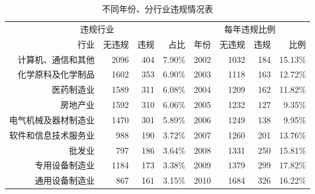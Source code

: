 \documentclass{article}
\begin{document}
\begin{table}[htbp]
  \centering\kaishu
  \caption{不同年份、分行业违规情况表}
    \begin{tabular}{rrrr|rrrr} \hline\hline
    \multicolumn{4}{c}{违规行业}      & \multicolumn{4}{c}{每年违规比例} \\
    行业    & 无违规   & 违规    & 占比 & 年份    & 无违规   & 违规    & 比例 \\ \hline
    计算机、通信和其他 & \multicolumn{1}{r}{2096} & \multicolumn{1}{r}{404} & \multicolumn{1}{r}{7.90\%} & \multicolumn{1}{r}{2002} & \multicolumn{1}{r}{1032} & \multicolumn{1}{r}{184} & \multicolumn{1}{r}{15.13\%} \\
    化学原料及化学制品 & \multicolumn{1}{r}{1602} & \multicolumn{1}{r}{353} & \multicolumn{1}{r}{6.90\%} & \multicolumn{1}{r}{2003} & \multicolumn{1}{r}{1118} & \multicolumn{1}{r}{163} & \multicolumn{1}{r}{12.72\%} \\
    医药制造业 & \multicolumn{1}{r}{1589} & \multicolumn{1}{r}{311} & \multicolumn{1}{r}{6.08\%} & \multicolumn{1}{r}{2004} & \multicolumn{1}{r}{1209} & \multicolumn{1}{r}{162} & \multicolumn{1}{r}{11.82\%} \\
    房地产业  & \multicolumn{1}{r}{1592} & \multicolumn{1}{r}{310} & \multicolumn{1}{r}{6.06\%} & \multicolumn{1}{r}{2005} & \multicolumn{1}{r}{1232} & \multicolumn{1}{r}{127} & \multicolumn{1}{r}{9.35\%} \\
    电气机械及器材制造业 & \multicolumn{1}{r}{1470} & \multicolumn{1}{r}{301} & \multicolumn{1}{r}{5.89\%} & \multicolumn{1}{r}{2006} & \multicolumn{1}{r}{1249} & \multicolumn{1}{r}{138} & \multicolumn{1}{r}{9.95\%} \\
    软件和信息技术服务业 & \multicolumn{1}{r}{988} & \multicolumn{1}{r}{190} & \multicolumn{1}{r}{3.72\%} & \multicolumn{1}{r}{2007} & \multicolumn{1}{r}{1260} & \multicolumn{1}{r}{201} & \multicolumn{1}{r}{13.76\%} \\
    批发业   & \multicolumn{1}{r}{797} & \multicolumn{1}{r}{186} & \multicolumn{1}{r}{3.64\%} & \multicolumn{1}{r}{2008} & \multicolumn{1}{r}{1331} & \multicolumn{1}{r}{250} & \multicolumn{1}{r}{15.81\%} \\
    专用设备制造业 & \multicolumn{1}{r}{1184} & \multicolumn{1}{r}{173} & \multicolumn{1}{r}{3.38\%} & \multicolumn{1}{r}{2009} & \multicolumn{1}{r}{1379} & \multicolumn{1}{r}{299} & \multicolumn{1}{r}{17.82\%} \\
    通用设备制造业 & \multicolumn{1}{r}{867} & \multicolumn{1}{r}{161} & \multicolumn{1}{r}{3.15\%} & \multicolumn{1}{r}{2010} & \multicolumn{1}{r}{1684} & \multicolumn{1}{r}{326} & \multicolumn{1}{r}{16.22\%} \\

\end{tabular}
\end{table}
\end{document}
